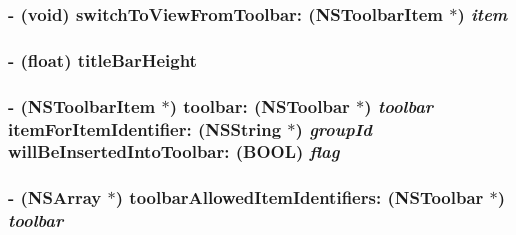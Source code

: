 \hypertarget{interface_c_m_window_controller_ddf4b3a6a3679a5058026e32515c0cf1}{
\subsubsection[switchToViewFromToolbar:]{\setlength{\rightskip}{0pt plus 5cm}- (void) switchToViewFromToolbar: (NSToolbarItem $\ast$) {\em item}}}
\label{interface_c_m_window_controller_ddf4b3a6a3679a5058026e32515c0cf1}


\hypertarget{interface_c_m_window_controller_ea152121637d5169165a54e790f5bdcd}{
\subsubsection[titleBarHeight]{\setlength{\rightskip}{0pt plus 5cm}- (float) titleBarHeight }}
\label{interface_c_m_window_controller_ea152121637d5169165a54e790f5bdcd}


\hypertarget{interface_c_m_window_controller_613c7f61a1b4830b616df8a23d8f12b9}{
\subsubsection[toolbar:itemForItemIdentifier:willBeInsertedIntoToolbar:]{\setlength{\rightskip}{0pt plus 5cm}- (NSToolbarItem $\ast$) toolbar: (NSToolbar $\ast$) {\em toolbar}\/ itemForItemIdentifier: ({\bf NSString} $\ast$) {\em groupId}\/ willBeInsertedIntoToolbar: (BOOL) {\em flag}}}
\label{interface_c_m_window_controller_613c7f61a1b4830b616df8a23d8f12b9}


\hypertarget{interface_c_m_window_controller_83412ac27a3c281c599e9d00ed8d1971}{
\subsubsection[toolbarAllowedItemIdentifiers:]{\setlength{\rightskip}{0pt plus 5cm}- (NSArray $\ast$) toolbarAllowedItemIdentifiers: (NSToolbar $\ast$) {\em toolbar}}}
\label{interface_c_m_window_controller_83412ac27a3c281c599e9d00ed8d1971}


